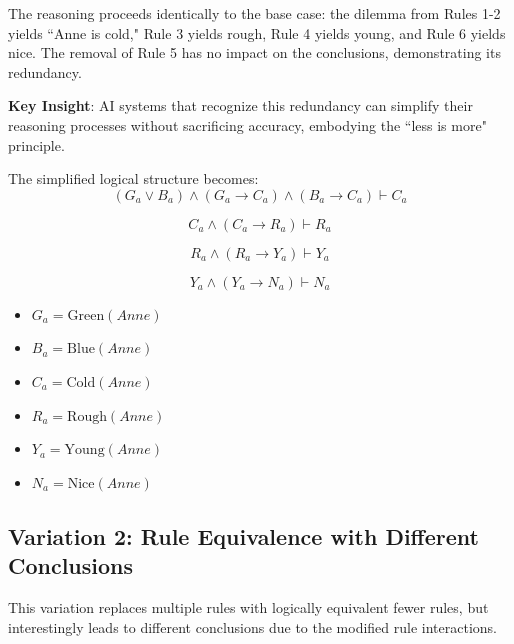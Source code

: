 \documentclass{article} %
\begin{document}
The reasoning proceeds identically to the base case: the dilemma from Rules 1-2 yields ``Anne is cold," Rule 3 yields rough, Rule 4 yields young, and Rule 6 yields nice. The removal of Rule 5 has no impact on the conclusions, demonstrating its redundancy.

\textbf{Key Insight}: AI systems that recognize this redundancy can simplify their reasoning processes without sacrificing accuracy, embodying the ``less is more" principle.

The simplified logical structure becomes:
\[
(G_a \lor B_a) \land (G_a \rightarrow C_a) \land (B_a \rightarrow C_a) \vdash C_a
\]

\[
C_a \land (C_a \rightarrow R_a) \vdash R_a
\]


\[
R_a \land (R_a \rightarrow Y_a) \vdash Y_a
\]


\[
Y_a \land (Y_a \rightarrow N_a) \vdash N_a
\]

\begin{itemize}
    \item $G_a = \mathrm{Green}(Anne)$
    \item $B_a = \mathrm{Blue}(Anne)$
    \item $C_a = \mathrm{Cold}(Anne)$
    \item $R_a = \mathrm{Rough}(Anne)$
    \item $Y_a = \mathrm{Young}(Anne)$
    \item $N_a = \mathrm{Nice}(Anne)$
\end{itemize}


\subsection{Variation 2: Rule Equivalence with Different Conclusions}

This variation replaces multiple rules with logically equivalent fewer rules, but interestingly leads to different conclusions due to the modified rule interactions.
\end{document}
